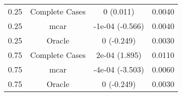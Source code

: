 \begin{table}[ht]
\centering
\begin{tabular}{cccc}
  \hline
  \hline
0.25 & Complete Cases & 0 (0.011) & 0.0040 \\ 
  0.25 & mcar & -1e-04 (-0.566) & 0.0040 \\ 
  0.25 & Oracle & 0 (-0.249) & 0.0030 \\ 
  0.75 & Complete Cases & 2e-04 (1.895) & 0.0110 \\ 
  0.75 & mcar & -4e-04 (-3.503) & 0.0060 \\ 
  0.75 & Oracle & 0 (-0.249) & 0.0030 \\ 
   \hline
\end{tabular}
\end{table}
